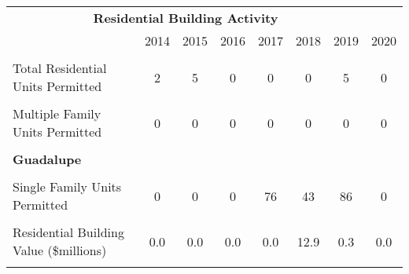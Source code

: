 \begin{table}
\centering
\begin{tabular}{lccccccc}
\toprule
\multicolumn{7}{c}{\textbf{Residential Building Activity}} \\
\cmidrule(l{3pt}r{3pt}){1-7}
  & 2014 & 2015 & 2016 & 2017 & 2018 & 2019 & 2020\\
\midrule
\textbf{\cellcolor{gray!6}{Carpinteria}} & \textbf{\cellcolor{gray!6}{}} & \textbf{\cellcolor{gray!6}{}} & \textbf{\cellcolor{gray!6}{}} & \textbf{\cellcolor{gray!6}{}} & \textbf{\cellcolor{gray!6}{}} & \textbf{\cellcolor{gray!6}{}} & \textbf{\cellcolor{gray!6}{}}\\
Total Residential Units Permitted & 2 & 5 & 0 & 0 & 0 & 5 & 0\\
\cellcolor{gray!6}{Single Family Units Permitted} & \cellcolor{gray!6}{2} & \cellcolor{gray!6}{5} & \cellcolor{gray!6}{0} & \cellcolor{gray!6}{0} & \cellcolor{gray!6}{0} & \cellcolor{gray!6}{5} & \cellcolor{gray!6}{0}\\
Multiple Family Units Permitted & 0 & 0 & 0 & 0 & 0 & 0 & 0\\
\cellcolor{gray!6}{Residential Building Value (\$millions)} & \cellcolor{gray!6}{0.4} & \cellcolor{gray!6}{1.8} & \cellcolor{gray!6}{0.0} & \cellcolor{gray!6}{1.3} & \cellcolor{gray!6}{0.6} & \cellcolor{gray!6}{1.2} & \cellcolor{gray!6}{2.3}\\
\addlinespace
\textbf{Guadalupe} & \textbf{} & \textbf{} & \textbf{} & \textbf{} & \textbf{} & \textbf{} & \textbf{}\\
\cellcolor{gray!6}{Total Residential Units Permitted} & \cellcolor{gray!6}{0} & \cellcolor{gray!6}{0} & \cellcolor{gray!6}{0} & \cellcolor{gray!6}{76} & \cellcolor{gray!6}{81} & \cellcolor{gray!6}{98} & \cellcolor{gray!6}{0}\\
Single Family Units Permitted & 0 & 0 & 0 & 76 & 43 & 86 & 0\\
\cellcolor{gray!6}{Multiple Family Units Permitted} & \cellcolor{gray!6}{0} & \cellcolor{gray!6}{0} & \cellcolor{gray!6}{0} & \cellcolor{gray!6}{0} & \cellcolor{gray!6}{38} & \cellcolor{gray!6}{12} & \cellcolor{gray!6}{0}\\
Residential Building Value (\$millions) & 0.0 & 0.0 & 0.0 & 0.0 & 12.9 & 0.3 & 0.0\\
\addlinespace
\textbf{\cellcolor{gray!6}{Lompoc}} & \textbf{\cellcolor{gray!6}{}} & \textbf{\cellcolor{gray!6}{}} & \textbf{\cellcolor{gray!6}{}} & \textbf{\cellcolor{gray!6}{}} & \textbf{\cellcolor{gray!6}{}} & \textbf{\cellcolor{gray!6}{}} & \textbf{\cellcolor{gray!6}{}}\\

\end{tabular}
\end{table}
